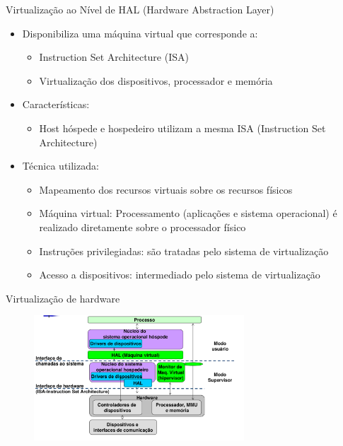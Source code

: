\documentclass{beamer}
\begin{document}
\begin{frame}{Virtualização ao Nível de HAL (Hardware Abstraction Layer)}
    \begin{itemize}
        \item Disponibiliza uma máquina virtual que corresponde a:
        \begin{itemize}
            \item Instruction Set Architecture (ISA)
            \item Virtualização dos dispositivos, processador e memória
        \end{itemize}
        
        \item Características:
        \begin{itemize}
            \item Host hóspede e hospedeiro utilizam a mesma ISA (Instruction Set Architecture)
        \end{itemize}

        \item Técnica utilizada:
        \begin{itemize}
            \item Mapeamento dos recursos virtuais sobre os recursos físicos
            \item Máquina virtual: Processamento (aplicações e sistema operacional) é realizado diretamente sobre o processador físico
            \item Instruções privilegiadas: são tratadas pelo sistema de virtualização
            \item Acesso a dispositivos: intermediado pelo sistema de virtualização
        \end{itemize}
    \end{itemize}
\end{frame}

\begin{frame}[fragile]{Virtualização de hardware}

    \begin{figure}[H]
        \centerline{\includegraphics[width=0.7\textwidth]{assets/aula-tads-sope/aula-03-03.png}}

    \end{figure}
\end{frame}
\end{document}
